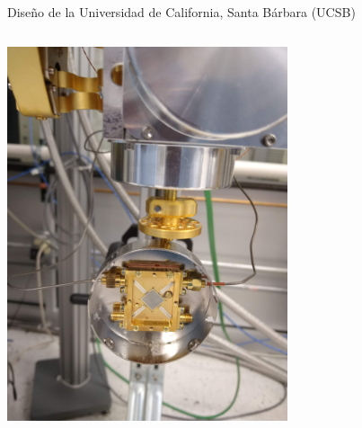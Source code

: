 \documentclass[ignorenonframetext,12pt]{beamer}
\begin{document}
\begin{frame}{Diseño de la Universidad de California, Santa Bárbara (UCSB)}
\begin{columns}
\begin{column}{0.49\textwidth}
												\includegraphics[angle=-90,width=0.62\textwidth]{mkid2}
								\end{column}
				\end{columns}
\end{frame}
\end{document}
